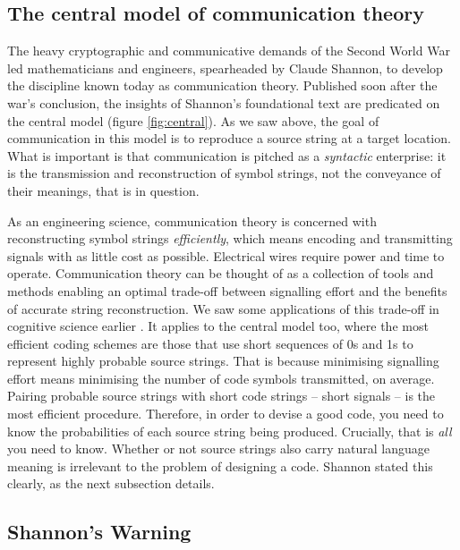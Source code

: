 \documentclass[12pt]{article}
\begin{document}
\subsection{The central model of communication theory}\label{subsec:central}

The heavy cryptographic and communicative demands of the Second World War led mathematicians and engineers, spearheaded by Claude Shannon, to develop the discipline known today as communication theory.
Published soon after the war's conclusion, the insights of Shannon's foundational text \parencite*{shannon1948mathematicalc} are predicated on the central model (figure \ref{fig:central}).
As we saw above, the goal of communication in this model is to reproduce a source string at a target location.
What is important is that communication is pitched as a \textit{syntactic} enterprise: it is the transmission and reconstruction of symbol strings, not the conveyance of their meanings, that is in question.

As an engineering science, communication theory is concerned with reconstructing symbol strings \textit{efficiently}, which means encoding and transmitting signals with as little cost as possible.
Electrical wires require power and time to operate.
Communication theory can be thought of as a collection of tools and methods enabling an optimal trade-off between signalling effort and the benefits of accurate string reconstruction.
We saw some applications of this trade-off in cognitive science earlier \citep{martinez2019representations,martinez2019deception,sims2016ratedistortion}.
It applies to the central model too, where the most efficient coding schemes are those that use short sequences of 0s and 1s to represent highly probable source strings.
That is because minimising signalling effort means minimising the number of code symbols transmitted, on average.
Pairing probable source strings with short code strings -- short signals -- is the most efficient procedure.
Therefore, in order to devise a good code, you need to know the probabilities of each source string being produced.
Crucially, that is \textit{all} you need to know.
Whether or not source strings also carry natural language meaning is irrelevant to the problem of designing a code.
Shannon stated this clearly, as the next subsection details.

\subsection{Shannon's Warning}\label{subsec:warning}
\end{document}
